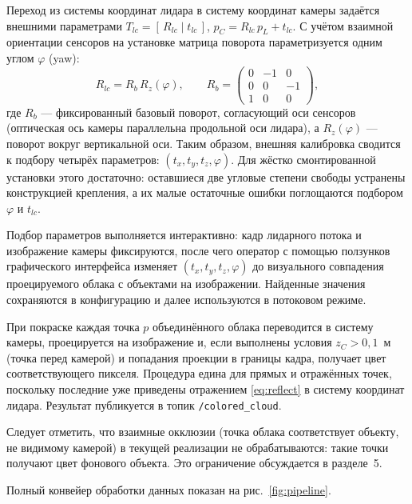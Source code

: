 \documentclass{misisarticle}
\begin{document}
Переход из системы координат лидара в систему координат камеры
задаётся внешними параметрами $T_{lc} = [\,R_{lc} \mid t_{lc}\,]$,
$p_C = R_{lc}\, p_L + t_{lc}$. С учётом взаимной ориентации сенсоров
на установке матрица поворота параметризуется одним углом $\varphi$
(yaw):
\begin{equation}
  R_{lc} = R_b\, R_z(\varphi), \qquad
  R_b = \begin{pmatrix}
    0 & -1 & 0 \\
    0 & 0 & -1 \\
    1 & 0 & 0
  \end{pmatrix},
  \label{eq:rlc}
\end{equation}
где $R_b$ --- фиксированный базовый поворот, согласующий оси сенсоров
(оптическая ось камеры параллельна продольной оси лидара), а
$R_z(\varphi)$ --- поворот вокруг вертикальной оси. Таким образом,
внешняя калибровка сводится к подбору четырёх параметров:
$(t_x, t_y, t_z, \varphi)$. Для жёстко смонтированной установки этого
достаточно: оставшиеся две угловые степени свободы устранены
конструкцией крепления, а их малые остаточные ошибки поглощаются
подбором $\varphi$ и $t_{lc}$.

Подбор параметров выполняется интерактивно: кадр лидарного потока и
изображение камеры фиксируются, после чего оператор с помощью
ползунков графического интерфейса изменяет $(t_x, t_y, t_z, \varphi)$
до визуального совпадения проецируемого облака с объектами на
изображении. Найденные значения сохраняются в конфигурацию и далее
используются в потоковом режиме.

При покраске каждая точка $p$ объединённого облака переводится в
систему камеры, проецируется на изображение и, если выполнены условия
$z_C > 0{,}1$~м (точка перед камерой) и попадания проекции в границы
кадра, получает цвет соответствующего пикселя. Процедура едина для
прямых и отражённых точек, поскольку последние уже приведены отражением
\eqref{eq:reflect} в систему координат лидара. Результат публикуется
в топик \texttt{/colored\_cloud}.

Следует отметить, что взаимные окклюзии (точка облака соответствует
объекту, не видимому камерой) в текущей реализации не обрабатываются:
такие точки получают цвет фонового объекта. Это ограничение обсуждается
в разделе~5.

Полный конвейер обработки данных показан на рис.~\ref{fig:pipeline}.
\end{document}
